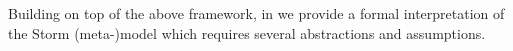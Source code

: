 \documentclass[smallextended]{svjour3}       %
\begin{document}
%



Building on top of the above framework, in \cite{MBER16} we provide a formal interpretation of the Storm (meta-)model which requires several abstractions and assumptions.

\end{document}
